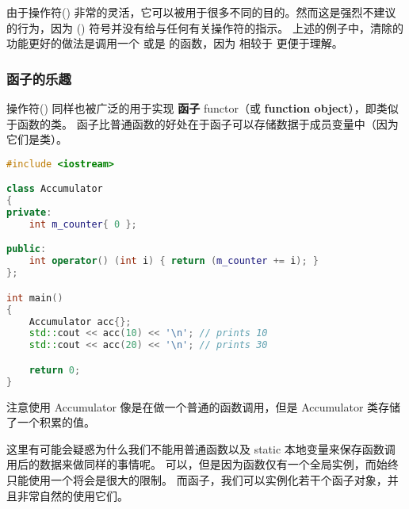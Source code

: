 \documentclass[../../LearnCpp.tex]{subfiles}
\begin{document}
由于操作符() 非常的灵活，它可以被用于很多不同的目的。然而这是强烈不建议的行为，因为 () 符号并没有给与任何有关操作符的指示。
上述的例子中，清除的功能更好的做法是调用一个  或是  的函数，因为 
相较于  更便于理解。

\subsubsection*{函子的乐趣}

操作符() 同样也被广泛的用于实现 \textbf{函子} functor（或 \textbf{function object}），即类似于函数的类。
函子比普通函数的好处在于函子可以存储数据于成员变量中（因为它们是类）。

\begin{lstlisting}[language=C++]
#include <iostream>

class Accumulator
{
private:
    int m_counter{ 0 };

public:
    int operator() (int i) { return (m_counter += i); }
};

int main()
{
    Accumulator acc{};
    std::cout << acc(10) << '\n'; // prints 10
    std::cout << acc(20) << '\n'; // prints 30

    return 0;
}
\end{lstlisting}

注意使用 Accumulator 像是在做一个普通的函数调用，但是 Accumulator 类存储了一个积累的值。

这里有可能会疑惑为什么我们不能用普通函数以及 static 本地变量来保存函数调用后的数据来做同样的事情呢。
可以，但是因为函数仅有一个全局实例，而始终只能使用一个将会是很大的限制。
而函子，我们可以实例化若干个函子对象，并且非常自然的使用它们。
\end{document}
